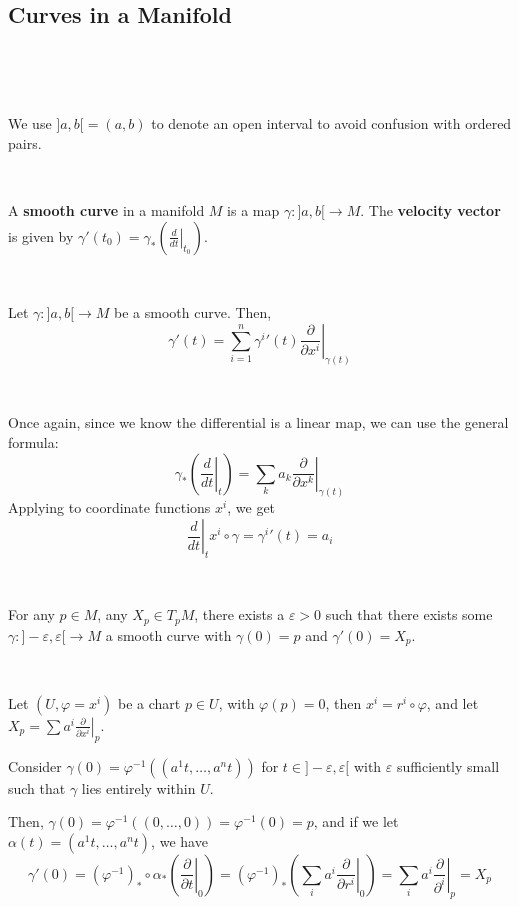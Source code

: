 \documentclass{article}
\begin{document}
\subsection{Curves in a Manifold}
\

\begin{remark}
  \

We use $]a,b[ = (a,b)$ to denote an open interval to avoid confusion with ordered pairs.
\end{remark}

\begin{definition}
  \

A \textbf{smooth curve} in a manifold $M$ is a map $\gamma: ]a,b[ \to M$. The \textbf{velocity vector} is given by $\gamma'(t_0) = \gamma_*(\left.\frac{d}{dt}\right\vert_{t_0})$.
\end{definition}

\begin{proposition}
  \

Let $\gamma: ]a,b[ \to M$ be a smooth curve. Then, $$\gamma'(t) = \sum_{i=1}^n {\gamma^i}'(t)\left.\frac{\partial}{\partial x^i}\right\vert_{\gamma(t)}$$
\end{proposition}

\begin{customproof}
  \

  Once again, since we know the differential is a linear map, we can use the general formula: $$\gamma_*(\left.\frac{d}{dt}\right\vert_t) = \sum_k a_k \left.\frac{\partial}{\partial x^k}\right\vert_{\gamma(t)}$$Applying to coordinate functions $x^i$, we get $$\left.\frac{d}{dt}\right\vert_t x^i \circ \gamma = {\gamma^i}'(t)= a_i$$
\end{customproof}

\begin{proposition}
  \

For any $p \in M$, any $X_p \in T_pM$, there exists a $\varepsilon > 0$ such that there exists some $\gamma: ]-\varepsilon,\varepsilon[ \to M$ a smooth curve with $\gamma(0) = p$ and $\gamma'(0) = X_p$.
\end{proposition}

\begin{customproof}
  \

  Let $(U, \varphi = x^i)$ be a chart $p \in U$, with $\varphi(p) = 0$, then $x^i = r^i \circ \varphi$, and let $X_p = \sum a^i \left.\frac{\partial}{\partial x^i}\right\vert_p$.

Consider $\gamma(0) = \varphi ^{-1}((a^1t, \dots, a^nt))$ for $t \in ]-\varepsilon, \varepsilon[$ with $\varepsilon$ sufficiently small such that $\gamma$ lies entirely within $U$.

  Then, $\gamma(0) = \varphi ^{-1}((0, \dots, 0)) = \varphi ^{-1}(0) = p$, and if we let $\alpha(t) = (a^1t, \dots, a^nt)$, we have$$\gamma'(0) = (\varphi ^{-1})_* \circ \alpha_*(\left.\frac{\partial}{\partial t}\right\vert_0) = (\varphi ^{-1})_*(\sum_i a^i \left.\frac{\partial}{\partial r^i}\right\vert_0) = \sum_i a^i \left.\frac{\partial}{\partial ^i}\right\vert_p = X_p$$
\end{customproof}
\end{document}
